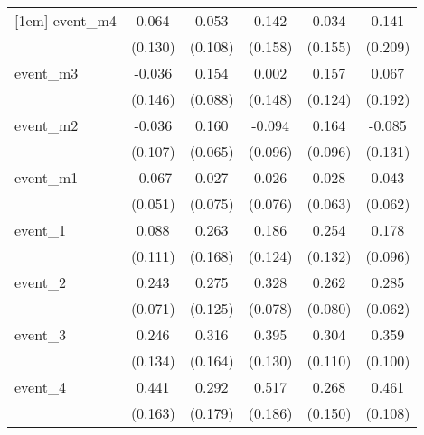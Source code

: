 {\begin{tabular}{l*{5}{c}}
[1em]
event\_m4    &       0.064         &       0.053         &       0.142         &       0.034         &       0.141         \\
            &     (0.130)         &     (0.108)         &     (0.158)         &     (0.155)         &     (0.209)         \\
[1em]
event\_m3    &      -0.036         &       0.154         &       0.002         &       0.157         &       0.067         \\
            &     (0.146)         &     (0.088)         &     (0.148)         &     (0.124)         &     (0.192)         \\
[1em]
event\_m2    &      -0.036         &       0.160\sym{*}  &      -0.094         &       0.164         &      -0.085         \\
            &     (0.107)         &     (0.065)         &     (0.096)         &     (0.096)         &     (0.131)         \\
[1em]
event\_m1    &      -0.067         &       0.027         &       0.026         &       0.028         &       0.043         \\
            &     (0.051)         &     (0.075)         &     (0.076)         &     (0.063)         &     (0.062)         \\
[1em]
event\_1     &       0.088         &       0.263         &       0.186         &       0.254         &       0.178         \\
            &     (0.111)         &     (0.168)         &     (0.124)         &     (0.132)         &     (0.096)         \\
[1em]
event\_2     &       0.243\sym{***}&       0.275\sym{*}  &       0.328\sym{***}&       0.262\sym{***}&       0.285\sym{***}\\
            &     (0.071)         &     (0.125)         &     (0.078)         &     (0.080)         &     (0.062)         \\
[1em]
event\_3     &       0.246         &       0.316         &       0.395\sym{**} &       0.304\sym{**} &       0.359\sym{***}\\
            &     (0.134)         &     (0.164)         &     (0.130)         &     (0.110)         &     (0.100)         \\
[1em]
event\_4     &       0.441\sym{**} &       0.292         &       0.517\sym{**} &       0.268         &       0.461\sym{***}\\
            &     (0.163)         &     (0.179)         &     (0.186)         &     (0.150)         &     (0.108)         \\

\end{tabular}}
